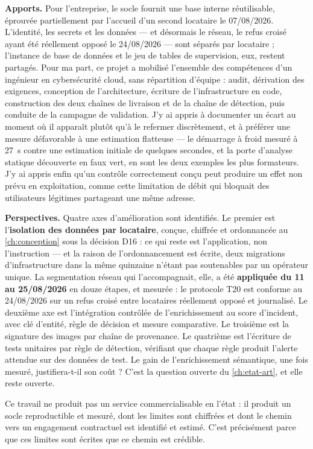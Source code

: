 \textbf{Apports.} Pour l'entreprise, le socle fournit une base interne réutilisable, éprouvée
partiellement par l'accueil d'un second locataire le 07/08/2026. L'identité, les secrets et les
données --- et désormais le réseau, le refus croisé ayant été réellement opposé le 24/08/2026 ---
sont séparés par locataire ; l'instance de base de données et le jeu de tables de supervision,
eux, restent partagés. Pour ma part, ce projet a mobilisé l'ensemble des compétences d'un
ingénieur en cybersécurité cloud, sans répartition d'équipe : audit, dérivation des exigences,
conception de l'architecture, écriture de l'infrastructure en code, construction des deux chaînes
de livraison et de la chaîne de détection, puis conduite de la campagne de validation. J'y ai
appris à documenter un écart au moment où il apparaît plutôt qu'à le refermer discrètement, et
à préférer une mesure défavorable à une estimation flatteuse --- le démarrage à froid mesuré à
27~s contre une estimation initiale de quelques secondes, et la porte d'analyse statique
découverte en faux vert, en sont les deux exemples les plus formateurs. J'y ai appris enfin qu'un
contrôle correctement conçu peut produire un effet non prévu en exploitation, comme cette
limitation de débit qui bloquait des utilisateurs légitimes partageant une même adresse.

\textbf{Perspectives.} Quatre axes d'amélioration sont identifiés. Le premier est
l'\textbf{isolation des données par locataire}, conçue, chiffrée et ordonnancée au \cref{ch:conception}
sous la décision D16 : ce qui reste est l'application, non l'instruction --- et la raison de
l'ordonnancement est écrite, deux migrations d'infrastructure dans la même quinzaine n'étant pas
soutenables par un opérateur unique. La segmentation réseau qui l'accompagnait, elle, a été
\textbf{appliquée du 11 au 25/08/2026} en douze étapes, et mesurée : le protocole T20 est
conforme au 24/08/2026 sur un refus croisé entre locataires réellement opposé et journalisé. Le
deuxième axe est l'intégration contrôlée de l'enrichissement au score d'incident, avec clé
d'entité, règle de décision et mesure comparative. Le troisième est la signature des images par
chaîne de provenance. Le quatrième est l'écriture de tests unitaires par règle de détection,
vérifiant que chaque règle produit l'alerte attendue sur des données de test. Le gain de
l'enrichissement sémantique, une fois mesuré, justifiera-t-il son coût ? C'est la question
ouverte du \cref{ch:etat-art}, et elle reste ouverte.

Ce travail ne produit pas un service commercialisable en l'état : il produit un socle
reproductible et mesuré, dont les limites sont chiffrées et dont le chemin vers un engagement
contractuel est identifié et estimé. C'est précisément parce que ces limites sont écrites que ce
chemin est crédible.
